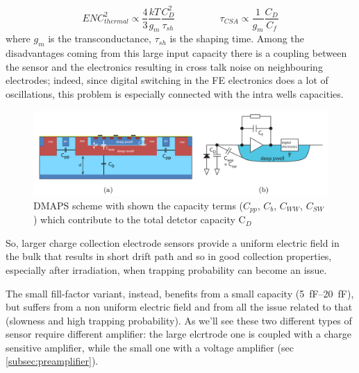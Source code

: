       \begin{equation}
         ENC^2 _ {thermal} \propto \frac{4}{3}\frac{kT}{g_m}\frac{C_D ^2}{\tau_{sh}}
         \hspace{55pt}
         \tau_{CSA} \propto \frac{1}{g_m}\frac{C_D}{C_f}
      \end{equation}
      where $g_m$ is the transconductance, $\tau_{sh}$ is the shaping time. 
      Among the disadvantages coming from this large input capacity there is a coupling between the sensor and the electronics resulting in cross talk noise on neighbouring electrodes; indeed, since digital switching in the FE electronics does a lot of oscillations, this problem is especially connected with the intra wells capacities.
      \begin{figure}[h!]
         \centering\includegraphics[width=12cm]{figures/Pixel_detectors/DMAPS_capacity.png}
         \caption{DMAPS scheme with shown the capacity terms ($C_{pp}$, $C_{b}$, $C_{WW}$, $C_{SW}$) which contribute to the total detctor capacity C$_{D}$}
         \label{fig:DMAPS_capacity}
      \end{figure}
      So, larger charge collection electrode sensors provide a uniform electric field in the bulk that results in short drift path and so in good collection properties, especially after irradiation, when trapping probability can become an issue.

      The small fill-factor variant, instead, benefits from a small capacity (\SIrange{5}{20}{fF}), but suffers from a non uniform electric field and from all the issue related to that (slowness and high trapping probability). 
      As we'll see these two different types of sensor require different amplifier: the large elcrtrode one is coupled with a charge sensitive amplifier, while the small one with a voltage amplifier (sec \ref{subsec:preamplifier}).

